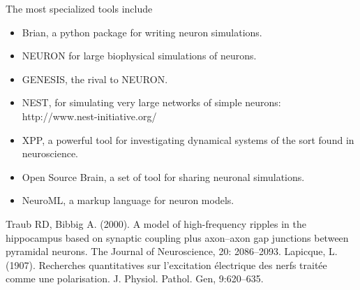 \documentclass[11pt,a4paper]{scrartcl}
\begin{document}
The most specialized tools include
\begin{itemize}
\item Brian, a python package for writing neuron simulations.

\item NEURON for large biophysical simulations of neurons.

\item GENESIS, the rival to NEURON.

\item NEST, for simulating very large networks of simple neurons: http://www.nest-initiative.org/

\item XPP, a powerful tool for investigating dynamical systems of the sort found in neuroscience.

\item Open Source Brain, a set of tool for sharing neuronal simulations.

\item NeuroML, a markup language for neuron models.

\end{itemize}

\begin{thebibliography}{10}

Traub RD, Bibbig A. (2000). A model of high-frequency ripples in the hippocampus based on synaptic coupling plus axon–axon gap junctions between pyramidal neurons. 
\newblock The Journal of Neuroscience, 20: 2086--2093.
Lapicque, L. (1907). 
\newblock Recherches quantitatives sur l'excitation électrique des nerfs traitée comme une polarisation. 
\newblock J. Physiol. Pathol. Gen, 9:620--635.

\end{thebibliography}
\end{document}

